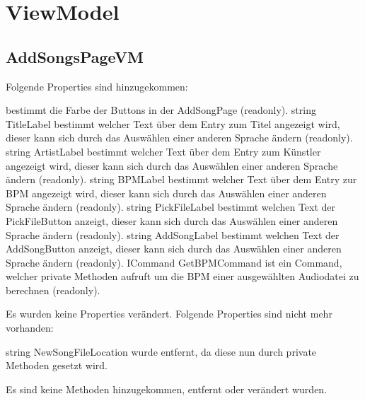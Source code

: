 \documentclass[../implementierung.tex]{subfiles}
\begin{document}
	\section{ViewModel}
		\subsection{AddSongsPageVM}
			Folgende Properties sind hinzugekommen:
			\begin{itemize}
				\add {} bestimmt die Farbe der Buttons in der AddSongPage (readonly).
				\add string TitleLabel bestimmt welcher Text über dem Entry zum Titel angezeigt wird, dieser kann sich durch das Auswählen einer anderen Sprache ändern (readonly).
				\add string ArtistLabel bestimmt welcher Text über dem Entry zum Künstler angezeigt wird, dieser kann sich durch das Auswählen einer anderen Sprache ändern (readonly).
				\add string BPMLabel bestimmt welcher Text über dem Entry zur BPM angezeigt wird, dieser kann sich durch das Auswählen einer anderen Sprache ändern (readonly).
				\add string PickFileLabel bestimmt welchen Text der PickFileButton anzeigt, dieser kann sich durch das Auswählen einer anderen Sprache ändern (readonly).
				\add string AddSongLabel bestimmt welchen Text der AddSongButton anzeigt, dieser kann sich durch das Auswählen einer anderen Sprache ändern (readonly).
				\add ICommand GetBPMCommand ist ein Command, welcher private Methoden aufruft um die BPM einer ausgewählten Audiodatei zu berechnen (readonly).
			\end{itemize}
			Es wurden keine Properties verändert. \newline
			Folgende Properties sind nicht mehr vorhanden:
			\begin{itemize}
				\remove string NewSongFileLocation wurde entfernt, da diese nun durch private Methoden gesetzt wird.
			\end{itemize}
			Es sind keine Methoden hinzugekommen, entfernt oder verändert wurden.
\end{document}
